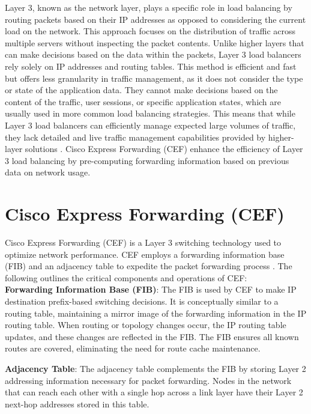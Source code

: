 \documentclass[12pt]{cwru_thesis}
\begin{document}
Layer 3, known as the network layer, plays a specific role in load balancing by routing packets based on their IP addresses as opposed to considering the current load on the network. This approach focuses on the distribution of traffic across multiple servers without inspecting the packet contents. Unlike higher layers that can make decisions based on the data within the packets, Layer 3 load balancers rely solely on IP addresses and routing tables. This method is efficient and fast but offers less granularity in traffic management, as it does not consider the type or state of the application data. They cannot make decisions based on the content of the traffic, user sessions, or specific application states, which are usually used in more common load balancing strategies. This means that while Layer 3 load balancers can efficiently manage expected large volumes of traffic, they lack detailed and live traffic management capabilities provided by higher-layer solutions  \cite{zhang}.
Cisco Express Forwarding (CEF) enhance the efficiency of Layer 3 load balancing by pre-computing forwarding information based on previous data on network usage.

\section{Cisco Express Forwarding (CEF)}

Cisco Express Forwarding (CEF)  is a Layer 3 switching technology used to optimize network performance. CEF employs a forwarding information base (FIB) and an adjacency table to expedite the packet forwarding process  \cite{cisco2017cef}. The following outlines the critical components and operations of CEF:\\

\textbf{Forwarding Information Base (FIB)}: The FIB is used by CEF to make IP destination prefix-based switching decisions. It is conceptually similar to a routing table, maintaining a mirror image of the forwarding information in the IP routing table. When routing or topology changes occur, the IP routing table updates, and these changes are reflected in the FIB. The FIB ensures all known routes are covered, eliminating the need for route cache maintenance.

\textbf{Adjacency Table}: The adjacency table complements the FIB by storing Layer 2 addressing information necessary for packet forwarding. Nodes in the network that can reach each other with a single hop across a link layer have their Layer 2 next-hop addresses stored in this table. 
\end{document}
